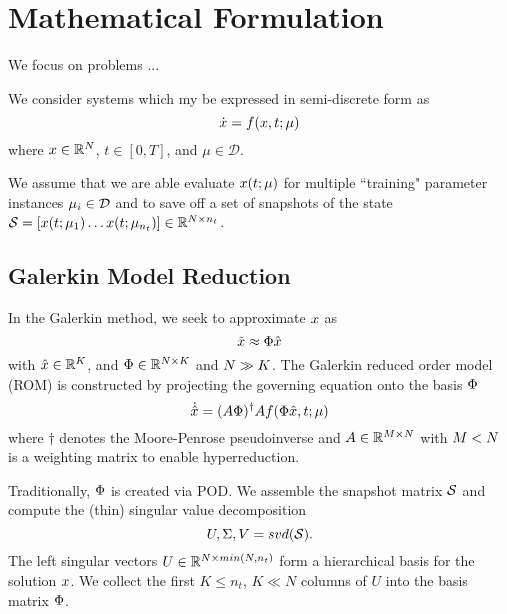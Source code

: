 
\section{Mathematical Formulation} \label{sec:formulation}

We focus on problems ...

We consider systems which my be expressed in semi-discrete form as
\begin{equation}
\dot{x} = f(x,t;\mu)
\end{equation}
where $x\in\mathbb{R}^{N}$, 
$t\in [0,T] $, 
and $\mu\in\mathcal{D}$.

We assume that we are able evaluate $x(t;\mu)$ for multiple ``training" parameter instances $\mu_i\in\mathcal{D}$ and to save off a set of snapshots of the state $\mathcal{S}=\left[ x(t;\mu_1) \dots x(t;\mu_{n_t}) \right] \in \mathbb{R}^{N\times n_t}$.

\subsection{Galerkin Model Reduction}

In the Galerkin method, we seek to approximate $x$ as 
\begin{equation}
\tilde{x}\approx\Phi\hat{x}
\end{equation}
with %
$\hat{x}\in\mathbb{R}^{K}$, and $\Phi\in\mathbb{R}^{N\times K}$ and $N\gg K$.
The Galerkin reduced order model (ROM) is constructed by projecting the governing equation onto the basis $\Phi$
\begin{equation}
\dot{\hat{x}} = (A\Phi)^\dagger Af(\Phi\hat{x},t;\mu)
\end{equation}
where $\dagger$ denotes the Moore-Penrose pseudoinverse and $A\in\mathbb{R}^{M\times N}$ with $M<N$ is a weighting matrix to enable hyperreduction.

Traditionally, $\Phi$ is created via POD.
We assemble the snapshot matrix $\mathcal{S}$ and compute the (thin) singular value decomposition
\begin{equation}
U,\Sigma, V = svd(\mathcal{S}).
\end{equation}
The left singular vectors $U\in\mathbb{R}^{N\times min(N,n_t)}$ form a hierarchical basis for the solution $x$.
We collect the first $K\leq n_t$, $K\ll N$ columns of $U$ into the basis matrix $\Phi$.

